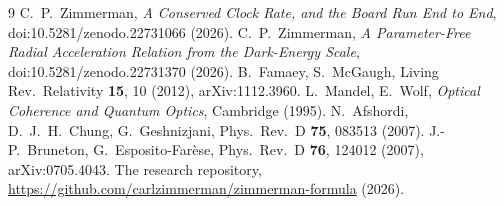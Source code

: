 \documentclass[11pt,letterpaper]{article}
\begin{document}
\begin{thebibliography}{9}
 C.~P.~Zimmerman, \emph{A Conserved Clock Rate, and the Board Run End to End}, doi:10.5281/zenodo.22731066 (2026).
 C.~P.~Zimmerman, \emph{A Parameter-Free Radial Acceleration Relation from the Dark-Energy Scale}, doi:10.5281/zenodo.22731370 (2026).
 B.~Famaey, S.~McGaugh, Living Rev.\ Relativity \textbf{15}, 10 (2012), arXiv:1112.3960.
 L.~Mandel, E.~Wolf, \emph{Optical Coherence and Quantum Optics}, Cambridge (1995).
 N.~Afshordi, D.~J.~H.~Chung, G.~Geshnizjani, Phys.\ Rev.\ D \textbf{75}, 083513 (2007).
 J.-P.~Bruneton, G.~Esposito-Far\`ese, Phys.\ Rev.\ D \textbf{76}, 124012 (2007), arXiv:0705.4043.
 The research repository, \url{https://github.com/carlzimmerman/zimmerman-formula} (2026).
\end{thebibliography}
\end{document}
